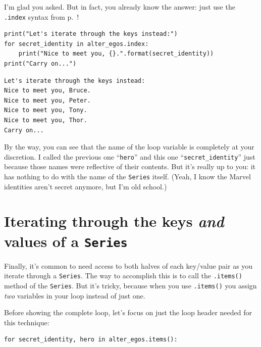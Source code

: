 
I'm glad you asked. But in fact, you already know the answer: just use the
\texttt{.index} syntax from p.~\pageref{dotIndex}!

\begin{Verbatim}[fontsize=\small,samepage=true,frame=single,framesep=3mm]
print("Let's iterate through the keys instead:")
for secret_identity in alter_egos.index:
    print("Nice to meet you, {}.".format(secret_identity))
print("Carry on...")
\end{Verbatim}

\begin{Verbatim}[fontsize=\small,samepage=true,frame=leftline,framesep=5mm,framerule=1mm]
Let's iterate through the keys instead:
Nice to meet you, Bruce.
Nice to meet you, Peter.
Nice to meet you, Tony.
Nice to meet you, Thor.
Carry on...
\end{Verbatim}


By the way, you can see that the name of the loop variable is completely at
your discretion. I called the previous one ``\texttt{hero}'' and this one
``\texttt{secret\_identity}'' just because those names were reflective of their
contents. But it's really up to you: it has nothing to do with the name of the
\texttt{Series} itself. (Yeah, I know the Marvel identities aren't secret
anymore, but I'm old school.)

\section[\small Iterating through keys/values of a \texttt{Series}]{Iterating through the keys \textit{and} values of a \texttt{Series}}


Finally, it's common to need access to both halves of each key/value pair as
you iterate through a \texttt{Series}. The way to accomplish this is to call
the \texttt{.items()} method of the \texttt{Series}. But it's tricky, because
when you use \texttt{.items()} you assign \textit{two} variables in your loop
instead of just one.

Before showing the complete loop, let's focus on just the loop header needed
for this technique:

\begin{Verbatim}[fontsize=\normalsize,samepage=true,frame=single,framesep=3mm]
for secret_identity, hero in alter_egos.items():
\end{Verbatim}


